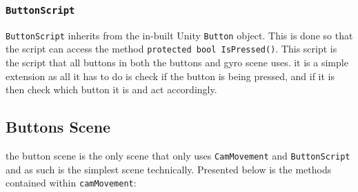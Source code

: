 \subsubsection{{\tt ButtonScript}}
{\tt ButtonScript} inherits from the in-built Unity {\tt Button} object. This is done so that the script can access the method {\tt   protected bool IsPressed()}. This script is the script that all buttons in both the buttons and gyro scene uses. it is a simple extension as all it has to do is check if the button is being pressed, and if it is then check which button it is and act accordingly. 
\subsection{Buttons Scene}
the button scene is the only scene that only uses  {\tt CamMovement} and {\tt ButtonScript} and as such is the simplest scene technically. Presented below is  the methods contained within {\tt camMovement}: 
